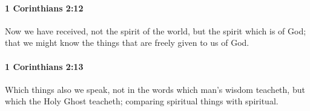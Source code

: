 		\paragraph{1 Corinthians 2:12} %
			\label{1CORINTHIANS-2-12}

			Now we have received, not the spirit of the world, but the spirit which is of God; that we might know the things that are freely given to us of God.

			\begin{framed}
			\scriptsize
				\begin{compactdesc}
					\item[SBLG] 
				\end{compactdesc}
			\end{framed}

		\paragraph{1 Corinthians 2:13} %
			\label{1CORINTHIANS-2-13}

			Which things also we speak, not in the words which man's wisdom teacheth, but which the Holy Ghost teacheth; comparing spiritual things with spiritual.

